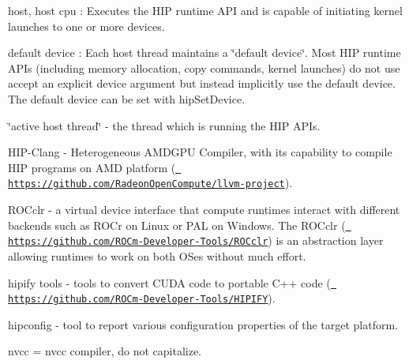 
\begin{DoxyItemize}
\item host, host cpu \+: Executes the HIP runtime API and is capable of initiating kernel launches to one or more devices.
\item default device \+: Each host thread maintains a \char`\"{}default device\char`\"{}. Most HIP runtime APIs (including memory allocation, copy commands, kernel launches) do not use accept an explicit device argument but instead implicitly use the default device. The default device can be set with hip\+Set\+Device.
\item \char`\"{}active host thread\char`\"{} -\/ the thread which is running the HIP APIs.
\item HIP-\/\+Clang -\/ Heterogeneous AMDGPU Compiler, with its capability to compile HIP programs on AMD platform (\href{https://github.com/RadeonOpenCompute/llvm-project}{\texttt{ https\+://github.\+com/\+Radeon\+Open\+Compute/llvm-\/project}}).
\item ROCclr -\/ a virtual device interface that compute runtimes interact with different backends such as ROCr on Linux or PAL on Windows. The ROCclr (\href{https://github.com/ROCm-Developer-Tools/ROCclr}{\texttt{ https\+://github.\+com/\+ROCm-\/\+Developer-\/\+Tools/\+ROCclr}}) is an abstraction layer allowing runtimes to work on both OSes without much effort.
\item hipify tools -\/ tools to convert CUDA code to portable C++ code (\href{https://github.com/ROCm-Developer-Tools/HIPIFY}{\texttt{ https\+://github.\+com/\+ROCm-\/\+Developer-\/\+Tools/\+HIPIFY}}).
\item hipconfig -\/ tool to report various configuration properties of the target platform.
\item nvcc = nvcc compiler, do not capitalize. 
\end{DoxyItemize}